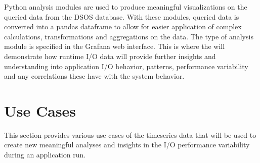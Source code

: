 \documentclass[conference]{IEEEtran}
\begin{document}
Python analysis modules are used to produce meaningful visualizations on the queried data from the DSOS database. With these modules, queried data is converted into a pandas dataframe to allow for easier application of complex calculations, transformations and aggregations on the data. The type of analysis module is specified in the Grafana web interface. This is where the \Darshan will demonstrate how runtime I/O data will provide further insights and understanding into application I/O behavior, patterns, performance variability and any correlations these have with the system behavior.   


\section{Use Cases}\label{AA}
This section provides various use cases of the \Darshan timeseries data that will be used to create new meaningful analyses and insights in the I/O performance variability during an application run.

\end{document}
